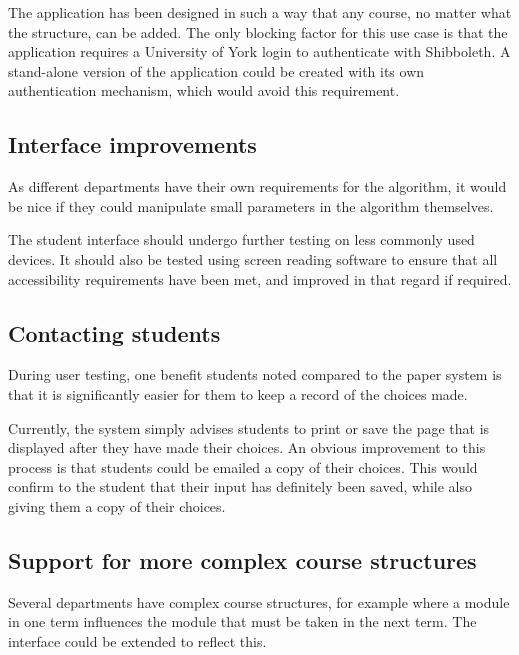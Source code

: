 \documentclass[draft]{scrartcl}
\begin{document}
The application has been designed in such a way that any course, no matter
what the structure, can be added. The only blocking factor for this use case
is that the application requires a University of York login to authenticate
with Shibboleth. A stand-alone version of the application could be created
with its own authentication mechanism, which would avoid this requirement.

\subsection{Interface improvements}

As different departments have their own requirements for the algorithm, it
would be nice if they could manipulate small parameters in the algorithm
themselves.

The student interface should undergo further testing on less commonly used
devices. It should also be tested using screen reading software to ensure that
all accessibility requirements have been met, and improved in that regard if
required.

\subsection{Contacting students}

During user testing, one benefit students noted compared to the paper system
is that it is significantly easier for them to keep a record of the choices
made.

Currently, the system simply advises students to print or save the page that
is displayed after they have made their choices. An obvious improvement to
this process is that students could be emailed a copy of their choices. This
would confirm to the student that their input has definitely been saved, while
also giving them a copy of their choices.

\subsection{Support for more complex course structures}

Several departments have complex course structures, for example where a module
in one term influences the module that must be taken in the next term. The
interface could be extended to reflect this.

% 
\end{document}

